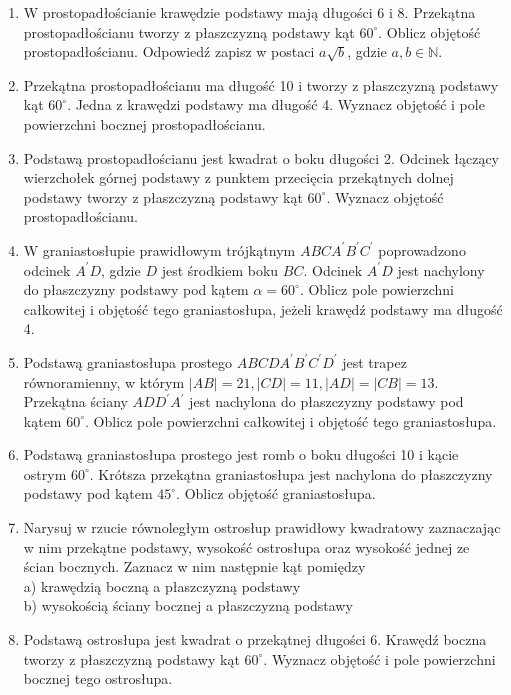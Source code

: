 \documentclass[10pt]{article}
\begin{document}
\begin{enumerate}
  \item W prostopadłościanie krawędzie podstawy mają długości 6 i 8. Przekątna prostopadłościanu tworzy z płaszczyzną podstawy kąt \(60^{\circ}\). Oblicz objętość prostopadłościanu. Odpowiedź zapisz w postaci \(a \sqrt{b}\), gdzie \(a, b \in \mathbb{N}\).
  \item Przekątna prostopadłościanu ma długość 10 i tworzy z płaszczyzną podstawy kąt \(60^{\circ}\). Jedna z krawędzi podstawy ma długość 4. Wyznacz objętość i pole powierzchni bocznej prostopadłościanu.
  \item Podstawą prostopadłościanu jest kwadrat o boku długości 2. Odcinek łączący wierzchołek górnej podstawy z punktem przecięcia przekątnych dolnej podstawy tworzy z płaszczyzną podstawy kąt \(60^{\circ}\). Wyznacz objętość prostopadłościanu.
  \item W graniastosłupie prawidłowym trójkątnym \(A B C A^{\prime} B^{\prime} C^{\prime}\) poprowadzono odcinek \(A^{\prime} D\), gdzie \(D\) jest środkiem boku \(B C\). Odcinek \(A^{\prime} D\) jest nachylony do płaszczyzny podstawy pod kątem \(\alpha=60^{\circ}\). Oblicz pole powierzchni całkowitej i objętość tego graniastosłupa, jeżeli krawędź podstawy ma długość 4.
  \item Podstawą graniastosłupa prostego \(A B C D A^{\prime} B^{\prime} C^{\prime} D^{\prime}\) jest trapez równoramienny, w którym \(|A B|=21,|C D|=11,|A D|=|C B|=13\). Przekątna ściany \(A D D^{\prime} A^{\prime}\) jest nachylona do płaszczyzny podstawy pod kątem \(60^{\circ}\). Oblicz pole powierzchni całkowitej i objętość tego graniastosłupa.
  \item Podstawą graniastosłupa prostego jest romb o boku długości 10 i kącie ostrym \(60^{\circ}\). Krótsza przekątna graniastosłupa jest nachylona do płaszczyzny podstawy pod kątem \(45^{\circ}\). Oblicz objętość graniastosłupa.
  \item Narysuj w rzucie równoległym ostrosłup prawidłowy kwadratowy zaznaczając w nim przekątne podstawy, wysokość ostrosłupa oraz wysokość jednej ze ścian bocznych. Zaznacz w nim następnie kąt pomiędzy\\
a) krawędzią boczną a płaszczyzną podstawy\\
b) wysokością ściany bocznej a płaszczyzną podstawy
  \item Podstawą ostrosłupa jest kwadrat o przekątnej długości 6. Krawędź boczna tworzy z płaszczyzną podstawy kąt \(60^{\circ}\). Wyznacz objętość i pole powierzchni bocznej tego ostrosłupa.

\end{enumerate}
\end{document}
